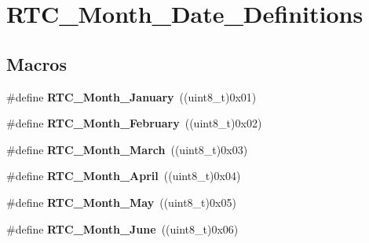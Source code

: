 \hypertarget{group___r_t_c___month___date___definitions}{}\section{R\+T\+C\+\_\+\+Month\+\_\+\+Date\+\_\+\+Definitions}
\label{group___r_t_c___month___date___definitions}
\subsection*{Macros}
\begin{DoxyCompactItemize}
\item 
\hypertarget{group___r_t_c___month___date___definitions_ga2a33537460ebe3cf38bf5e1cf75df306}{}\#define {\bfseries R\+T\+C\+\_\+\+Month\+\_\+\+January}~((uint8\+\_\+t)0x01)\label{group___r_t_c___month___date___definitions_ga2a33537460ebe3cf38bf5e1cf75df306}

\item 
\hypertarget{group___r_t_c___month___date___definitions_ga00224b67848d0c679f1353373061f400}{}\#define {\bfseries R\+T\+C\+\_\+\+Month\+\_\+\+February}~((uint8\+\_\+t)0x02)\label{group___r_t_c___month___date___definitions_ga00224b67848d0c679f1353373061f400}

\item 
\hypertarget{group___r_t_c___month___date___definitions_ga842c0d17229fc43d4571307b8466e50e}{}\#define {\bfseries R\+T\+C\+\_\+\+Month\+\_\+\+March}~((uint8\+\_\+t)0x03)\label{group___r_t_c___month___date___definitions_ga842c0d17229fc43d4571307b8466e50e}

\item 
\hypertarget{group___r_t_c___month___date___definitions_gabdf30fd0fafd83af7630bc5e653b876e}{}\#define {\bfseries R\+T\+C\+\_\+\+Month\+\_\+\+April}~((uint8\+\_\+t)0x04)\label{group___r_t_c___month___date___definitions_gabdf30fd0fafd83af7630bc5e653b876e}

\item 
\hypertarget{group___r_t_c___month___date___definitions_ga1a14ee22b8202e3faefc9b1d41ae91e6}{}\#define {\bfseries R\+T\+C\+\_\+\+Month\+\_\+\+May}~((uint8\+\_\+t)0x05)\label{group___r_t_c___month___date___definitions_ga1a14ee22b8202e3faefc9b1d41ae91e6}

\item 
\hypertarget{group___r_t_c___month___date___definitions_ga3b02772afa467bf8d1e4ccbc64486506}{}\#define {\bfseries R\+T\+C\+\_\+\+Month\+\_\+\+June}~((uint8\+\_\+t)0x06)\label{group___r_t_c___month___date___definitions_ga3b02772afa467bf8d1e4ccbc64486506}


\end{DoxyCompactItemize}
